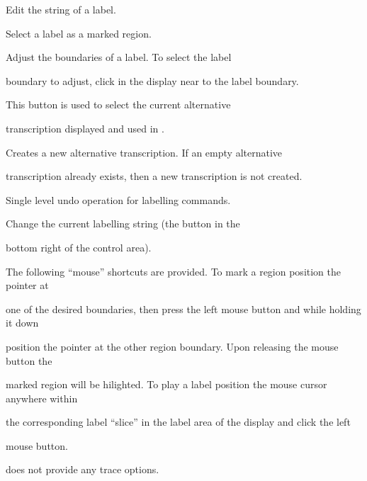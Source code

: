 \begin{optlist}
   Edit the string of a label.





   Select a label as a marked region.





   Adjust the boundaries of a label.  To select the label 


      boundary to adjust, click in the display near to the label boundary.





   This button is used to select the current alternative 


      transcription displayed and used in .





   Creates a new alternative transcription. If an empty alternative 


      transcription already exists, then a new transcription is not created.





   Single level undo operation for labelling commands.





   Change the current labelling string (the button in the 


  bottom right of the control area).


\end{optlist}





The following ``mouse'' shortcuts are provided. To mark a region position the pointer at


one of the desired boundaries, then press the left mouse button and while holding it down


position the pointer at the other region boundary. Upon releasing the mouse button the 


marked region will be hilighted. To play a label position the mouse cursor anywhere within


the corresponding label ``slice'' in the label area of the display and click the left


mouse button.







 does not provide any trace options.



















